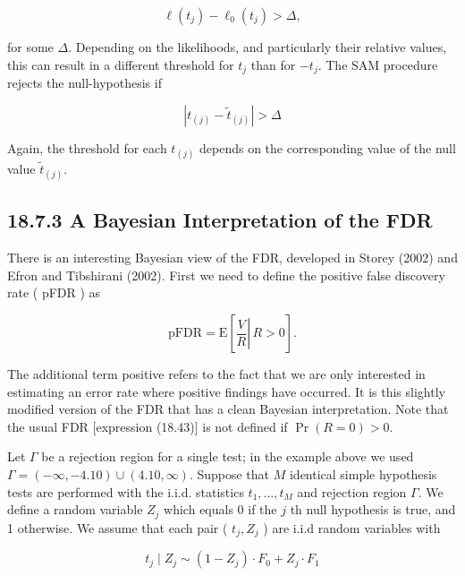 \documentclass[10pt]{article}
\begin{document}
\begin{equation*}
\ell\left(t_{j}\right)-\ell_{0}\left(t_{j}\right)>\Delta, \tag{18.48}
\end{equation*}


for some $\Delta$. Depending on the likelihoods, and particularly their relative values, this can result in a different threshold for $t_{j}$ than for $-t_{j}$. The SAM procedure rejects the null-hypothesis if


\begin{equation*}
\left|t_{(j)}-\tilde{t}_{(j)}\right|>\Delta \tag{18.49}
\end{equation*}


Again, the threshold for each $t_{(j)}$ depends on the corresponding value of the null value $\tilde{t}_{(j)}$.

\subsection*{18.7.3 A Bayesian Interpretation of the FDR}
There is an interesting Bayesian view of the FDR, developed in Storey (2002) and Efron and Tibshirani (2002). First we need to define the positive false discovery rate ( pFDR ) as


\begin{equation*}
\mathrm{pFDR}=\mathrm{E}\left[\left.\frac{V}{R} \right\rvert\, R>0\right] . \tag{18.50}
\end{equation*}


The additional term positive refers to the fact that we are only interested in estimating an error rate where positive findings have occurred. It is this slightly modified version of the FDR that has a clean Bayesian interpretation. Note that the usual FDR [expression (18.43)] is not defined if $\operatorname{Pr}(R=0)>0$.

Let $\Gamma$ be a rejection region for a single test; in the example above we used $\Gamma=(-\infty,-4.10) \cup(4.10, \infty)$. Suppose that $M$ identical simple hypothesis tests are performed with the i.i.d. statistics $t_{1}, \ldots, t_{M}$ and rejection region $\Gamma$. We define a random variable $Z_{j}$ which equals 0 if the $j$ th null hypothesis is true, and 1 otherwise. We assume that each pair ( $t_{j}, Z_{j}$ ) are i.i.d random variables with


\begin{equation*}
t_{j} \mid Z_{j} \sim\left(1-Z_{j}\right) \cdot F_{0}+Z_{j} \cdot F_{1} \tag{18.51}
\end{equation*}
\end{document}
